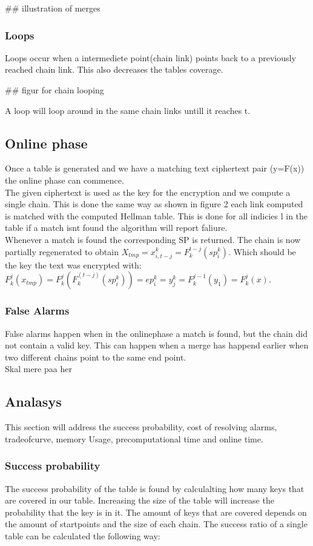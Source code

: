   ## illustration of merges
  \subsubsection{Loops}
  Loops occur when a intermediete point(chain link) points back to a previously reached chain link. This also decreases the tables coverage.

  ## figur for chain looping

  A loop will loop around in the same chain links untill it reaches t.

\subsection*{Online phase}
Once a table is generated and we have a matching text ciphertext pair (y=F(x)) the online phase can commence.\\
The given ciphertext is used as the key for the encryption and we compute a single chain. This is done the same way as shown in figure 2 each link computed is matched with the computed Hellman table. This is done for all indicies l in the table if a match isnt found the algorithm will report faliure.\\

Whenever a match is found the corresponding SP is returned. The chain is now partially regenerated to obtain $X_{tmp}=x^k_{i,t-j}=F^{t-j}_k(sp^k_i)$. Which should be the key the text was encrypted with:\\
$F^j_k(x_{tmp})=F^j_k(F^(t-j)_k(sp^k_i))=ep^k_i=y^k_j=F^{j-1}_k(y_1)=F^j_k(x) $.
\\


\subsubsection{False Alarms}
False alarms happen when in the onlinephase a match is found, but the chain did not contain a valid key. This can happen when a merge has happend earlier when two different chains point to the same end point.
\\
Skal mere paa her

\subsection*{Analasys}
This section will address the success probability, cost of resolving alarms, tradeofcurve, memory Usage, precomputational time and online time.

\subsubsection{Success probability}
The success probability of the table is found by calculalting how many keys that are covered in our table. Increasing the size of the table will increase the probability that the key is in it. The amount of keys that are covered depends on the amount of startpoints and the size of each chain. The success ratio of a single table can be calculated the following way:

